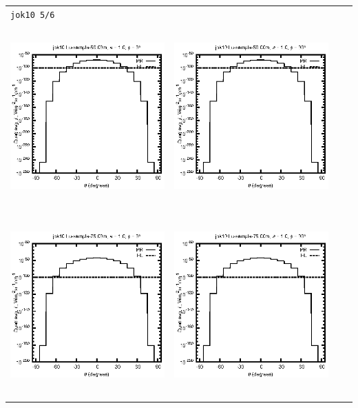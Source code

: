 \begin{tabular}{c c c c}
\multicolumn{4}{l}{\texttt{jok10 5/6}} \\
\includegraphics[height=7cm]{../eps/jok10_Lu_sample_50.00m_fwd.eps} &
\includegraphics[height=7cm]{../eps/jok10_Lu_sample_50.00m_cross.eps} \\
\includegraphics[height=7cm]{../eps/jok10_Lu_sample_75.00m_fwd.eps} &
\includegraphics[height=7cm]{../eps/jok10_Lu_sample_75.00m_cross.eps} \\

\end{tabular}

